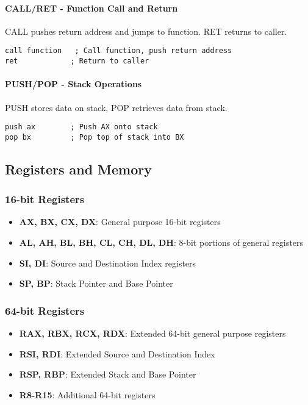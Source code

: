 \documentclass[12pt,a4paper]{article}
\begin{document}
\paragraph{CALL/RET - Function Call and Return}
CALL pushes return address and jumps to function. RET returns to caller.
\begin{lstlisting}
call function   ; Call function, push return address
ret            ; Return to caller
\end{lstlisting}

\paragraph{PUSH/POP - Stack Operations}
PUSH stores data on stack, POP retrieves data from stack.
\begin{lstlisting}
push ax        ; Push AX onto stack
pop bx         ; Pop top of stack into BX
\end{lstlisting}

\subsection{Registers and Memory}

\subsubsection{16-bit Registers}
\begin{itemize}
\item \textbf{AX, BX, CX, DX}: General purpose 16-bit registers
\item \textbf{AL, AH, BL, BH, CL, CH, DL, DH}: 8-bit portions of general registers
\item \textbf{SI, DI}: Source and Destination Index registers
\item \textbf{SP, BP}: Stack Pointer and Base Pointer
\end{itemize}

\subsubsection{64-bit Registers}
\begin{itemize}
\item \textbf{RAX, RBX, RCX, RDX}: Extended 64-bit general purpose registers
\item \textbf{RSI, RDI}: Extended Source and Destination Index
\item \textbf{RSP, RBP}: Extended Stack and Base Pointer
\item \textbf{R8-R15}: Additional 64-bit registers
\end{itemize}
\end{document}
